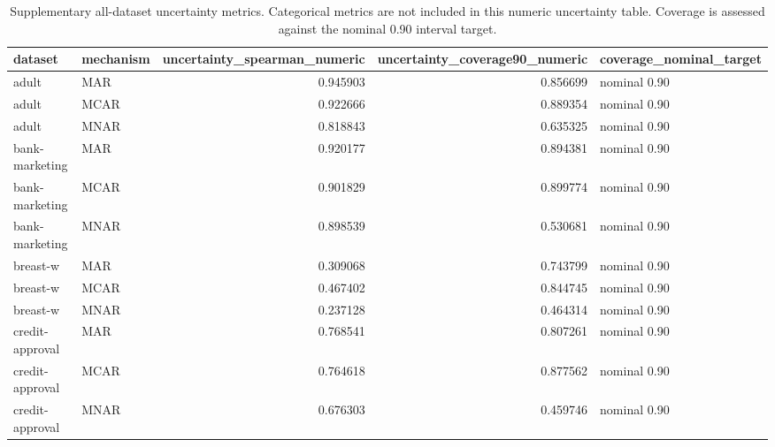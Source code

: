 \begin{table}[ht]
\centering
\caption{Supplementary all-dataset uncertainty metrics. Categorical metrics are not included in this numeric uncertainty table. Coverage is assessed against the nominal 0.90 interval target.}
\label{tab:protocol_a_project_mice_uncertainty_all_datasets_supplementary}
\begin{tabular}{llrrl}
\hline
 dataset              & mechanism   &   uncertainty\_spearman\_numeric &   uncertainty\_coverage90\_numeric & coverage\_nominal\_target   \\
\hline
 adult                & MAR         &                    0.945903    &                         0.856699 & nominal 0.90              \\
 adult                & MCAR        &                    0.922666    &                         0.889354 & nominal 0.90              \\
 adult                & MNAR        &                    0.818843    &                         0.635325 & nominal 0.90              \\
 bank-marketing       & MAR         &                    0.920177    &                         0.894381 & nominal 0.90              \\
 bank-marketing       & MCAR        &                    0.901829    &                         0.899774 & nominal 0.90              \\
 bank-marketing       & MNAR        &                    0.898539    &                         0.530681 & nominal 0.90              \\
 breast-w             & MAR         &                    0.309068    &                         0.743799 & nominal 0.90              \\
 breast-w             & MCAR        &                    0.467402    &                         0.844745 & nominal 0.90              \\
 breast-w             & MNAR        &                    0.237128    &                         0.464314 & nominal 0.90              \\
 credit-approval      & MAR         &                    0.768541    &                         0.807261 & nominal 0.90              \\
 credit-approval      & MCAR        &                    0.764618    &                         0.877562 & nominal 0.90              \\
 credit-approval      & MNAR        &                    0.676303    &                         0.459746 & nominal 0.90              \\

\end{tabular}
\end{table}
